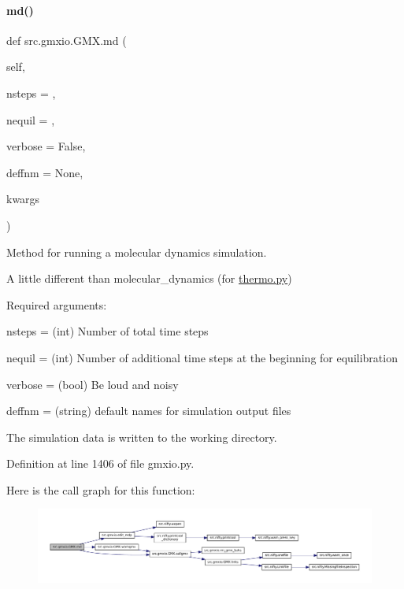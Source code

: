 \paragraph{\texorpdfstring{md()}{md()}}
{\footnotesize\ttfamily def src.\+gmxio.\+G\+M\+X.\+md (\begin{DoxyParamCaption}\item[{}]{self,  }\item[{}]{nsteps = {},  }\item[{}]{nequil = {},  }\item[{}]{verbose = {\ttfamily False},  }\item[{}]{deffnm = {\ttfamily None},  }\item[{}]{kwargs }\end{DoxyParamCaption})}



Method for running a molecular dynamics simulation. 

A little different than molecular\+\_\+dynamics (for \hyperlink{thermo_8py}{thermo.\+py}) \begin{DoxyVerb}   Required arguments:

   nsteps = (int) Number of total time steps

   nequil = (int) Number of additional time steps at the beginning
   for equilibration

   verbose = (bool) Be loud and noisy

   deffnm = (string) default names for simulation output files

   The simulation data is written to the working directory.\end{DoxyVerb}
 

Definition at line 1406 of file gmxio.\+py.

Here is the call graph for this function\+:
\nopagebreak
\begin{figure}[H]
\begin{center}
\leavevmode
\includegraphics[width=350pt]{classsrc_1_1gmxio_1_1GMX_a3133906ca908cb9a5e6fc816460ec498_cgraph}
\end{center}
\end{figure}
\mbox{\label{classsrc_1_1gmxio_1_1GMX_abab1e48b2b3d25277b9f4392807938ae}} 
